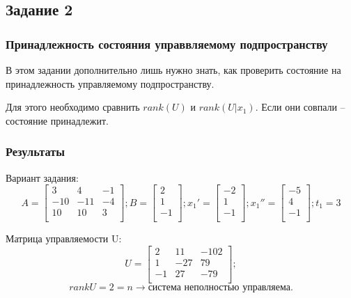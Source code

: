\subsection{Задание 2}
\subsubsection{Принадлежность состояния управвляемому подпространству}
В этом задании дополнительно лишь нужно знать, как проверить состояние на принадлежность управляемому подпространству.

Для этого необходимо сравнить \(rank(U)\) и \(rank(U | x_1)\). Если они совпали -- состояние принадлежит.


\subsubsection{Результаты}
Вариант задания:
\[ A = \begin{bmatrix}
        3 & 4 & -1 \\
        -10 & -11 & -4 \\
        10 & 10 & 3 \\
        \end{bmatrix}; 
        B = \begin{bmatrix}
                2 \\
                1 \\
                -1 \\
                \end{bmatrix}; 
        x_1' = \begin{bmatrix}
                -2 \\
                1 \\
                -1 \\
                \end{bmatrix}; 
        x_1'' = \begin{bmatrix}
                -5 \\
                4 \\
                -1 \\
                \end{bmatrix}; 
        t_1 = 3
\]

Матрица управляемости U:
\[ U = \begin{bmatrix}
        2 & 11 & -102 \\
        1 & -27 & 79 \\
        -1 & 27 & -79 \\
        \end{bmatrix};
\]
\[rankU = 2 = n \rightarrow \text{система  неполностью управляема.}\]

